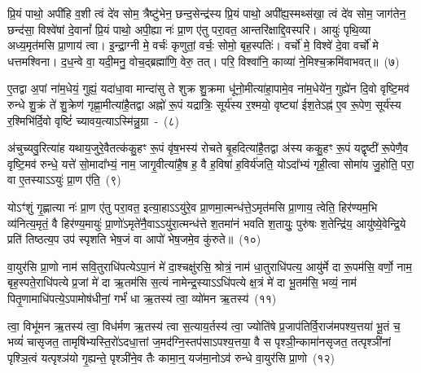 प्रि॒यं पाथो॒ अपी॑हि व॒शी त्वं दे॑व सोम॒ त्रैष्टु॑भेन॒ छन्द॒सेन्द्र॑स्य प्रि॒यं पाथो॒ अपी᳚ह्य॒स्मथ्स॑खा॒ त्वं दे॑व सोम॒ जाग॑तेन॒ छन्द॑सा॒ विश्वे॑षां दे॒वानां᳚ प्रि॒यं पाथो॒ अपी॒ह्या नः॑ प्रा॒ण ए॑तु परा॒वत॒ आन्तरि॑क्षाद्दि॒वस्परि॑। आयुः॑ पृथि॒व्या अध्य॒मृत॑मसि प्रा॒णाय॑ त्वा। इ॒न्द्रा॒ग्नी मे॒ वर्चः॑ कृणुतां॒ वर्चः॒ सोमो॒ बृह॒स्पतिः॑। वर्चो॑ मे॒ विश्वे॑ दे॒वा वर्चो॑ मे धत्तमश्विना। द॒ध॒न्वे वा॒ यदी॒मनु॒ वोच॒द्ब्रह्मा॑णि॒ वेरु॒ तत्। परि॒ विश्वा॑नि॒ काव्या॑ ने॒मिश्च॒क्रमि॑वाभवत्॥~(७)\ip

{\anuvakamend[{शक्व॑रीष्व॒ग्नेर्बृह॒स्पतिः॒ पञ्च॑विꣳशतिश्च}]}

ए॒तद्वा अ॒पां ना॑म॒धेयं॒ गुह्यं॒ यदा॑धा॒वा मान्दा॑सु ते शुक्र शु॒क्रमा धू॑नो॒मीत्या॑हा॒पामे॒व ना॑म॒धेये॑न॒ गुह्ये॑न दि॒वो वृष्टि॒मव॑ रुन्धे शु॒क्रं ते॑ शु॒क्रेण॑ गृह्णा॒मीत्या॑है॒तद्वा अह्नो॑ रू॒पं यद्रात्रिः॒ सूर्य॑स्य र॒श्मयो॒ वृष्ट्या॑ ईश॒ते\-ऽह्न॑ ए॒व रू॒पेण॒ सूर्य॑स्य र॒श्मिभि॑र्दि॒वो वृष्टिं॑ च्यावय॒त्या\-ऽस्मि॑न्नु॒ग्रा~-~(८)\ip

अ॑चुच्यवु॒रित्या॑ह यथाय॒जुरे॒वैतत्क॑कु॒हꣳ रू॒पं वृ॑ष॒भस्य॑ रोचते बृ॒हदित्या॑है॒तद्वा अ॑स्य ककु॒हꣳ रू॒पं यद्वृष्टी॑ रू॒पेणै॒व वृष्टि॒मव॑ रुन्धे॒ यत्ते॑ सो॒मादा᳚भ्यं॒ नाम॒ जागृ॒वीत्या॑है॒ष ह॒ वै ह॒विषा॑ ह॒विर्य॑जति॒ यो\-ऽ\-दा᳚भ्यं गृही॒त्वा सोमा॑य जु॒होति॒ परा॒ वा ए॒तस्या\-ऽऽ\-युः॑ प्रा॒ण ए॑ति॒~(९)\ip

यो\-ऽꣳ॑शुं गृ॒ह्णात्या नः॑ प्रा॒ण ए॑तु परा॒वत॒ इत्या॒हा\-ऽऽ\-यु॑रे॒व प्रा॒णमा॒त्मन्ध॑त्ते॒\-ऽमृत॑मसि प्रा॒णाय॒ त्वेति॒ हिर॑ण्यम॒भि व्य॑नित्य॒मृतं॒ वै हिर॑ण्य॒मायुः॑ प्रा॒णो॑\-ऽमृते॑नै॒वा\-ऽऽ\-\-यु॑रा॒त्मन्ध॑त्ते श॒तमा॑नं भवति श॒तायुः॒ पुरु॑षः श॒तेन्द्रि॑य॒ आयु॑ष्ये॒वेन्द्रि॒ये प्रति॑ तिष्ठत्य॒प उप॑ स्पृशति भेष॒जं वा आपो॑ भेष॒जमे॒व कु॑रुते॥~(१०)\ip

{\anuvakamend[{उ॒ग्रा ए॒त्याप॒स्त्रीणि॑ च}]}

वा॒युर॑सि प्रा॒णो नाम॑ सवि॒तुराधि॑पत्ये\-ऽपा॒नं मे॑ दा॒श्चक्षु॑रसि॒ श्रोत्रं॒ नाम॑ धा॒तुराधि॑पत्य॒ आयु॑र्मे दा रू॒पम॑सि॒ वर्णो॒ नाम॒ बृह॒स्पते॒राधि॑पत्ये प्र॒जां मे॑ दा ऋ॒तम॑सि स॒त्यं नामेन्द्र॒स्या\-ऽऽ\-धि॑पत्ये क्ष॒त्रं मे॑ दा भू॒तम॑सि॒ भव्यं॒ नाम॑ पितृ॒णामाधि॑पत्ये॒\-ऽपामोष॑धीनां॒ गर्भं॑ धा ऋ॒तस्य॑ त्वा॒ व्यो॑मन ऋ॒तस्य॑~(११)\ip

त्वा॒ विभू॑मन ऋ॒तस्य॑ त्वा॒ विध॑र्मण ऋ॒तस्य॑ त्वा स॒त्याय॒र्तस्य॑ त्वा॒ ज्योति॑षे प्र॒जा\-प॑तिर्वि॒राज॑मपश्य॒त्तया॑ भू॒तं च॒ भव्यं॑ चासृजत॒ तामृषि॑भ्यस्ति॒रो॑\-ऽदधा॒त्तां ज॒मद॑ग्नि॒स्तप॑सा\-ऽपश्य॒त्तया॒ वै स पृश्ञी॒न्कामा॑नसृजत॒ तत्पृश्ञी॑नां पृश्ञि॒त्वं यत्पृश्ञ॑यो गृ॒ह्यन्ते॒ पृश्ञी॑ने॒व तैः कामा॒न्॒ यज॑मा॒नो\-ऽव॑ रुन्धे वा॒युर॑सि प्रा॒णो~(१२)\ip

